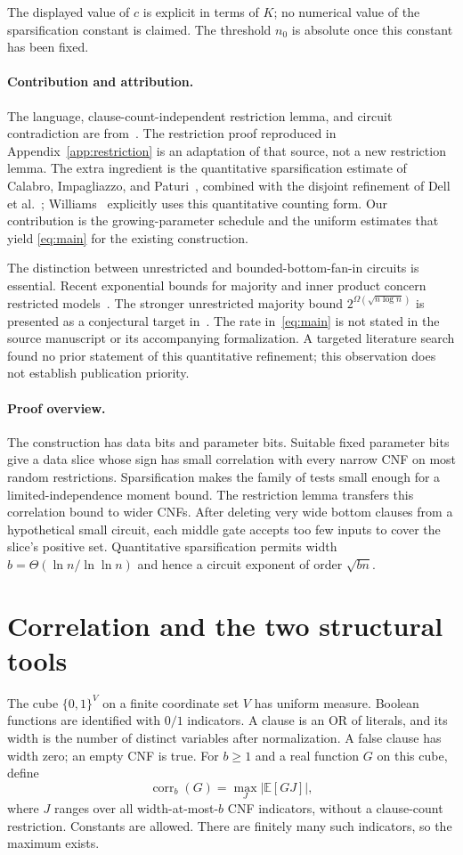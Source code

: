 \documentclass[11pt,letterpaper]{article}
\theoremstyle{definition}
\numberwithin{equation}{section}
\newcommand{\E}{\mathbb E}
\newcommand{\bits}{\{0,1\}}
\DeclareMathOperator{\corr}{corr}
\begin{document}
The displayed value of $c$ is explicit in terms of $K$; no numerical
value of the sparsification constant is claimed. The threshold $n_0$ is
absolute once this constant has been fixed.

\paragraph{Contribution and attribution.}
The language, clause-count-independent restriction lemma, and circuit
contradiction are from~\cite{OAI26}. The restriction proof reproduced in
Appendix~\ref{app:restriction} is an adaptation of that source, not a new
restriction lemma. The extra ingredient is the quantitative sparsification
estimate of Calabro, Impagliazzo, and Paturi~\cite{CIP}, combined with the
disjoint refinement of Dell et al.~\cite{DHMTW}; Williams~\cite{Williams}
explicitly uses this quantitative counting form. Our contribution is the
growing-parameter schedule and the uniform estimates that yield
\eqref{eq:main} for the existing construction.

The distinction between unrestricted and bounded-bottom-fan-in circuits
is essential. Recent exponential bounds for majority and inner product
concern restricted models~\cite{GKKPRST,GKPRT26IP}. The stronger unrestricted
majority bound $2^{\Omega(\sqrt{n\log n})}$ is presented as a conjectural
target in~\cite{GKKPRST}. The rate in~\eqref{eq:main} is not stated in
the source manuscript or its accompanying formalization. A targeted
literature search found no prior statement of this quantitative refinement;
this observation does not establish publication priority.

\paragraph{Proof overview.}
The construction has data bits and parameter bits. Suitable fixed parameter
bits give a data slice whose sign has small correlation with every narrow
CNF on most random restrictions. Sparsification makes the family of tests
small enough for a limited-independence moment bound. The restriction lemma
transfers this correlation bound to wider CNFs. After deleting very wide
bottom clauses from a hypothetical small circuit, each middle gate accepts
too few inputs to cover the slice's positive set. Quantitative
sparsification permits width $b=\Theta(\ln n/\ln\ln n)$ and hence a circuit
exponent of order $\sqrt{bn}$.

\section{Correlation and the two structural tools}\label{sec:tools}
The cube $\bits^V$ on a finite coordinate set $V$ has uniform measure.
Boolean functions are identified with $0/1$ indicators. A clause is an OR
of literals, and its width is the number of distinct variables after
normalization. A false clause has width zero; an empty CNF is true.
For $b\ge1$ and a real function $G$ on this cube, define
\[
 \corr_b(G)=\max_J |\E[GJ]|,
\]
where $J$ ranges over all width-at-most-$b$ CNF indicators, without a
clause-count restriction. Constants are allowed. There are finitely many
such indicators, so the maximum exists.
\end{document}
